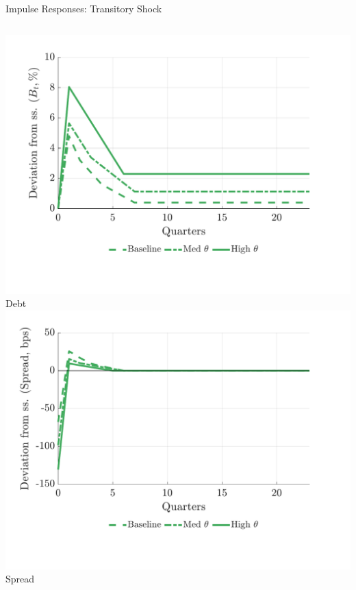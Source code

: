 \documentclass[aspectratio=169,11pt,professionalfonts]{beamer}
\newcommand{\1}{\mathbb{1}}
\begin{document}
\begin{frame}{Impulse Responses: Transitory Shock}
\begin{columns}[T,onlytextwidth]
    \includegraphics[width=\linewidth]{../../pro-default-model/results/comparison_figure_14.pdf}\\[-0.5em]
    {\scriptsize Debt}
    \includegraphics[width=\linewidth]{../../pro-default-model/results/comparison_figure_16.pdf}\\[-0.5em]
    {\scriptsize Spread}
  \end{columns}
\end{frame}
\end{document}
